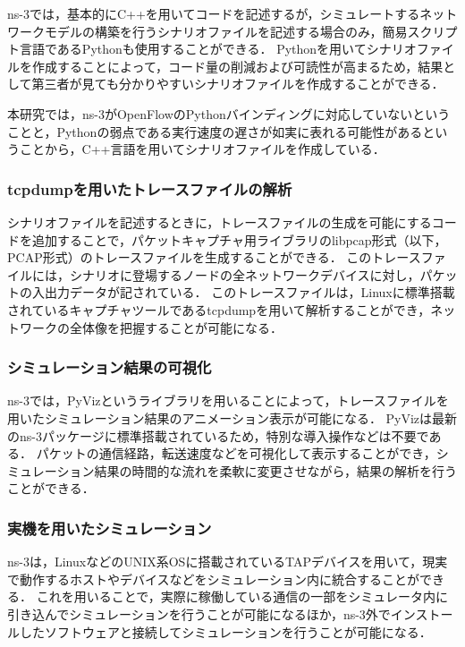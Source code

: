 ns-3では，基本的にC++を用いてコードを記述するが，シミュレートするネットワークモデルの構築を行うシナリオファイルを記述する場合のみ，簡易スクリプト言語であるPythonも使用することができる．
Pythonを用いてシナリオファイルを作成することによって，コード量の削減および可読性が高まるため，結果として第三者が見ても分かりやすいシナリオファイルを作成することができる．

本研究では，ns-3がOpenFlowのPythonバインディングに対応していないということと，Pythonの弱点である実行速度の遅さが如実に表れる可能性があるということから，C++言語を用いてシナリオファイルを作成している．

\subsubsection{tcpdumpを用いたトレースファイルの解析}

シナリオファイルを記述するときに，トレースファイルの生成を可能にするコードを追加することで，パケットキャプチャ用ライブラリのlibpcap形式（以下，PCAP形式）のトレースファイルを生成することができる．
このトレースファイルには，シナリオに登場するノードの全ネットワークデバイスに対し，パケットの入出力データが記されている．
このトレースファイルは，Linuxに標準搭載されているキャプチャツールであるtcpdumpを用いて解析することができ，ネットワークの全体像を把握することが可能になる．

\subsubsection{シミュレーション結果の可視化}

ns-3では，PyVizというライブラリを用いることによって，トレースファイルを用いたシミュレーション結果のアニメーション表示が可能になる．
PyVizは最新のns-3パッケージに標準搭載されているため，特別な導入操作などは不要である．
パケットの通信経路，転送速度などを可視化して表示することができ，シミュレーション結果の時間的な流れを柔軟に変更させながら，結果の解析を行うことができる．

\subsubsection{実機を用いたシミュレーション}

ns-3は，LinuxなどのUNIX系OSに搭載されているTAPデバイスを用いて，現実で動作するホストやデバイスなどをシミュレーション内に統合することができる．
これを用いることで，実際に稼働している通信の一部をシミュレータ内に引き込んでシミュレーションを行うことが可能になるほか，ns-3外でインストールしたソフトウェアと接続してシミュレーションを行うことが可能になる．

